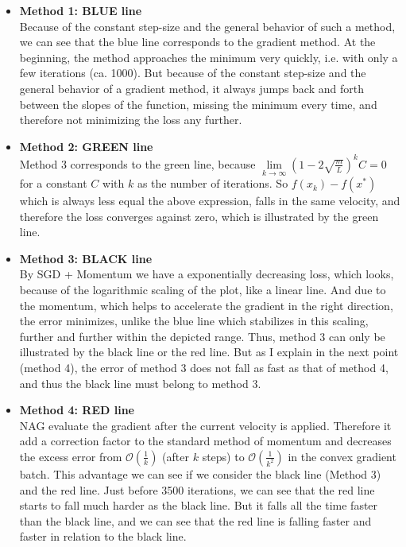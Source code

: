 \documentclass[a4paper]{article}
\begin{document}
        \begin{itemize}
            \item \textbf{Method 1: BLUE line}\\
                Because of the constant step-size and the general behavior of such a method, we can see that the blue line corresponds to the gradient method.
                At the beginning, the method approaches the minimum very quickly, i.e. with only a few iterations (ca. 1000). 
                But because of the constant step-size and the general behavior of a gradient method, it always jumps back and forth between the slopes of the function, missing the minimum every time, and therefore not minimizing the loss any further.
            
            \item \textbf{Method 2: GREEN line}\\
                Method 3 corresponds to the green line, because $\lim\limits_{k \rightarrow \infty} (1-2\sqrt{\frac{m}{L}})^kC = 0$ for a constant $C$ with $k$ as the number of iterations.
                So $f(x_k) - f(x^*)$ which is always less equal the above expression, falls in the same velocity, and therefore the loss converges against zero, which is illustrated by the green line.
            
            \item \textbf{Method 3: BLACK line}\\
                By SGD + Momentum we have a exponentially decreasing loss, which looks, because of the logarithmic scaling of the plot, like a linear line.
                And due to the momentum, which helps to accelerate the gradient in the right direction, the error minimizes, unlike the blue line which stabilizes in this scaling, further and further within the depicted range.
                Thus, method 3 can only be illustrated by the black line or the red line.
                But as I explain in the next point (method 4), the error of method 3 does not fall as fast as that of method 4, and thus the black line must belong to method 3.
            
            \item \textbf{Method 4: RED line}\\
                NAG evaluate the gradient after the current velocity is applied.
                Therefore it add a correction factor to the standard method of momentum and decreases the excess error from $\mathcal{O}(\frac{1}{k})$ (after $k$ steps) to $\mathcal{O}(\frac{1}{k^2})$ in the convex gradient batch.
                This advantage we can see if we consider the black line (Method 3) and the red line.
                Just before 3500 iterations, we can see that the red line starts to fall much harder as the black line.
                But it falls all the time faster than the black line, and we can see that the red line is falling faster and faster in relation to the black line.
                
            
        \end{itemize}
\end{document}
